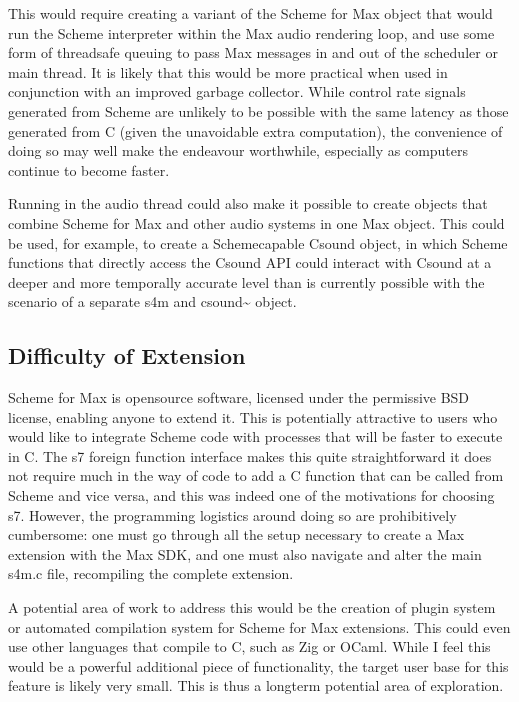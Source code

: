 \documentclass[letterpaper,10pt,english]{sphinxmanual}
\begin{document}
\sphinxAtStartPar
This would require creating a variant of the Scheme for Max object that would
run the Scheme interpreter within the Max audio rendering loop,
and use some form of thread\sphinxhyphen{}safe queuing to pass Max messages in and out of the
scheduler or main thread.
It is likely that this would be more practical when used in conjunction with
an improved garbage collector.
While control rate signals generated from Scheme are unlikely to be possible
with the same latency as those generated from C (given the unavoidable extra
computation), the convenience of doing so may well make the endeavour worthwhile,
especially as computers continue to become faster.

\sphinxAtStartPar
Running in the audio thread could also make it possible to create objects
that combine Scheme for Max and other audio systems in one Max object.
This could be used, for example, to create a Scheme\sphinxhyphen{}capable Csound object,
in which Scheme functions that directly access the Csound API could interact
with Csound at a deeper and more temporally accurate level than is currently possible
with the scenario of a separate s4m and csound\textasciitilde{} object.


\subsection{Difficulty of Extension}
\label{\detokenize{conclusion:difficulty-of-extension}}
\sphinxAtStartPar
Scheme for Max is open\sphinxhyphen{}source software, licensed under the permissive BSD license,
enabling anyone to extend it.
This is potentially attractive to users who would like to integrate Scheme code
with processes that will be faster to execute in C.
The s7 foreign function interface makes this quite straightforward \sphinxhyphen{} it does not
require much in the way of code to add a C function that can be called from
Scheme and vice versa, and this was indeed one of the motivations for choosing s7.
However, the programming logistics around doing so are prohibitively cumbersome:
one must go through all the setup necessary to create a Max extension with the
Max SDK, and one must also navigate and alter the main s4m.c file, recompiling
the complete extension.

\sphinxAtStartPar
A potential area of work to address this would be the creation of plugin system
or automated compilation system for Scheme for Max extensions.
This could even use other languages that compile to C, such as Zig or OCaml.
While I feel this would be a powerful additional piece of functionality,
the target user base for this feature is likely very small.
This is thus a long\sphinxhyphen{}term potential area of exploration.
\end{document}

